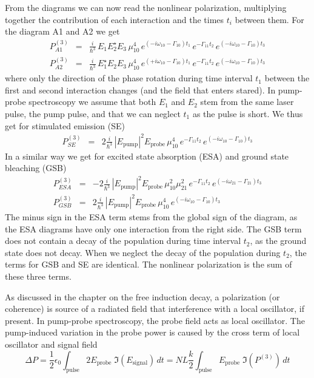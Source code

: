 From the diagrams we can now read the nonlinear polarization, multiplying together the contribution of each interaction and the times $t_i$ between them.
For the diagram A1 and A2 we get
\begin{eqnarray}
P^{(3)}_{A1} & =& \frac{i}{\hbar^3} \,  E_1 E_2^\star E_3 \, \mu_{10}^4 \,
e^{ (-i \omega_{10} - \Gamma_{10}) t_1 } \,
e^{  - \Gamma_{11} t_2 } \,
e^{ (-i \omega_{10} - \Gamma_{10}) t_3 }  \\
P^{(3)}_{A2} & =& \frac{i}{\hbar^3} \,  E_1^\star E_2 E_3 \, \mu_{10}^4 \,
e^{ (+i \omega_{10} - \Gamma_{10}) t_1 } \,
e^{  - \Gamma_{11} t_2 } \,
e^{ (-i \omega_{10} - \Gamma_{10}) t_3 }  
\end{eqnarray}
where only the direction of the phase rotation during time interval $t_1$ between the first and second interaction changes (and the field that enters stared). In pump-probe spectroscopy we assume that both $E_1$ and $E_2$ stem from the same laser pulse, the pump pulse, and that we can neglect $t_1$ as the pulse is short. We thus get for stimulated emission (SE)
\begin{eqnarray}
P^{(3)}_{SE} & =& 2 \frac{i}{\hbar^3} \,  | E_\text{pump}|^2 E_\text{probe} \, \mu_{10}^4 \,
e^{  - \Gamma_{11} t_2 } \,
e^{ (-i \omega_{10} - \Gamma_{10}) t_3 } 
\end{eqnarray}
In a similar way we get for excited state absorption (ESA) and ground state bleaching (GSB)
\begin{eqnarray}
P^{(3)}_{ESA} & =& -2 \frac{i}{\hbar^3} \,  | E_\text{pump}|^2 E_\text{probe} \, \mu_{10}^2 \mu_{21}^2 \,
e^{  - \Gamma_{11} t_2 } \,
e^{ (-i \omega_{21} - \Gamma_{21}) t_3 }  \\
P^{(3)}_{GSB}  & =& 2 \frac{i}{\hbar^3} \,  | E_\text{pump}|^2 E_\text{probe} \, \mu_{10}^4 \,
e^{ (-i \omega_{10} - \Gamma_{10}) t_3 } 
\end{eqnarray}
The minus sign in the ESA term stems from the global sign of the diagram, as the ESA diagrams have only one interaction from the right side. The GSB term does not contain a decay of the population during time interval $t_2$, as the ground state does not decay. When we neglect the decay of the population during $t_2$, the terms for GSB and SE are identical. The nonlinear polarization is the sum of these three terms.


As discussed in the chapter on the free induction decay, a polarization (or coherence) is source of a radiated field that interference with a local oscillator, if present. In pump-probe spectroscopy, the probe field acts as local oscillator. The pump-induced variation in the probe power is caused by the cross term of local oscillator and signal field
\begin{equation}
 \Delta P = \frac{1}{2} \epsilon_0 \int_\text{pulse}  2 E_\text{probe} \; \Im (E_\text{signal} ) \, dt 
 = N L \frac{k}{2}  \int_\text{pulse}   E_\text{probe} \; \Im ( P^{(3)} ) \, dt
\end{equation}

